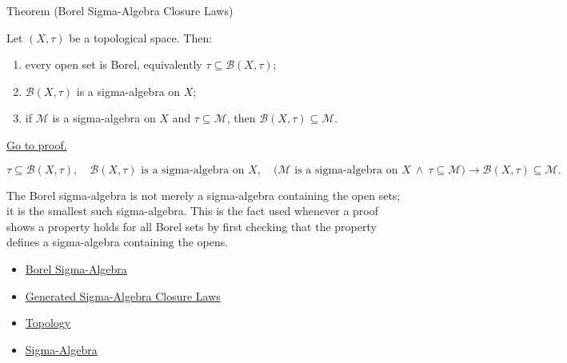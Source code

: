 \begin{theorembox}{Theorem (Borel Sigma-Algebra Closure Laws)}
\begin{theorem}\label{thm:borel-sigma-algebra-closure-laws}
Let \((X,\tau)\) be a topological space.  Then:
\begin{enumerate}[label=(\roman*)]
\item every open set is Borel, equivalently \(\tau\subseteq\mathcal B(X,\tau)\);
\item \(\mathcal B(X,\tau)\) is a sigma-algebra on \(X\);
\item if \(\mathcal M\) is a sigma-algebra on \(X\) and
      \(\tau\subseteq\mathcal M\), then
      \(\mathcal B(X,\tau)\subseteq\mathcal M\).
\end{enumerate}
\hyperref[prf:borel-sigma-algebra-closure-laws]{Go to proof.}
\end{theorem}
\end{theorembox}

\begin{remark*}
\[
\tau\subseteq\mathcal B(X,\tau),\quad
\mathcal B(X,\tau)\text{ is a sigma-algebra on }X,\quad
\bigl(\mathcal M\text{ is a sigma-algebra on }X\ \wedge\ \tau\subseteq\mathcal M\bigr)
\to
\mathcal B(X,\tau)\subseteq\mathcal M.
\]
\end{remark*}

\begin{remark*}[Interpretation]
The Borel sigma-algebra is not merely a sigma-algebra containing the open sets;
it is the smallest such sigma-algebra.  This is the fact used whenever a proof
shows a property holds for all Borel sets by first checking that the property
defines a sigma-algebra containing the opens.
\end{remark*}


\begin{dependencies}
\begin{itemize}
  \item \hyperref[def:borel-sigma-algebra]{Borel Sigma-Algebra}
  \item \hyperref[thm:generated-sigma-algebra-closure-laws]{Generated Sigma-Algebra Closure Laws}
  \item \hyperref[def:topology]{Topology}
  \item \hyperref[def:sigma-algebra]{Sigma-Algebra}
\end{itemize}
\end{dependencies}

